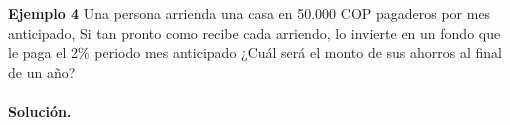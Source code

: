 	\textbf{Ejemplo 4}\newline
	Una persona arrienda una casa en 50.000 COP pagaderos por mes anticipado, Si tan pronto como recibe cada arriendo, lo invierte en un fondo que le paga el 2\% periodo mes anticipado ¿Cuál será el monto de sus ahorros al final de un año?\\ \\

	\textbf{Solución.}\\
